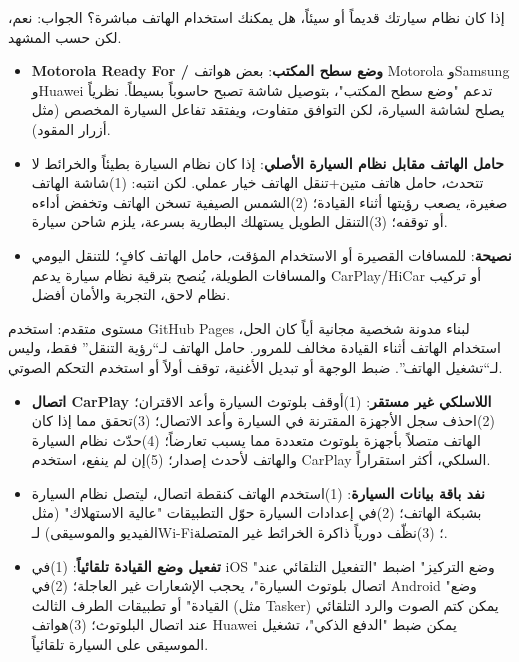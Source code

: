 
إذا كان نظام سيارتك قديماً أو سيئاً، هل يمكنك استخدام الهاتف مباشرة؟ الجواب: نعم، لكن حسب المشهد.

\begin{itemize}
  \item \textbf{Motorola Ready For / وضع سطح المكتب}: بعض هواتف Motorola وSamsung وHuawei تدعم "وضع سطح المكتب"، بتوصيل شاشة تصبح حاسوباً بسيطاً. نظرياً يصلح لشاشة السيارة، لكن التوافق متفاوت، ويفتقد تفاعل السيارة المخصص (مثل أزرار المقود).
  \item \textbf{حامل الهاتف مقابل نظام السيارة الأصلي}: إذا كان نظام السيارة بطيئاً والخرائط لا تتحدث، حامل هاتف متين+تنقل الهاتف خيار عملي. لكن انتبه: (1)شاشة الهاتف صغيرة، يصعب رؤيتها أثناء القيادة؛ (2)الشمس الصيفية تسخن الهاتف وتخفض أداءه أو توقفه؛ (3)التنقل الطويل يستهلك البطارية بسرعة، يلزم شاحن سيارة.
  \item \textbf{نصيحة}: للمسافات القصيرة أو الاستخدام المؤقت، حامل الهاتف كافٍ؛ للتنقل اليومي والمسافات الطويلة، يُنصح بترقية نظام سيارة يدعم CarPlay/HiCar أو تركيب نظام لاحق، التجربة والأمان أفضل.
\end{itemize}

\begin{tcbwarn}{مستوى متقدم: استخدم GitHub Pages لبناء مدونة شخصية مجانية}
أياً كان الحل، استخدام الهاتف أثناء القيادة مخالف للمرور. حامل الهاتف لـ“رؤية التنقل” فقط، وليس لـ“تشغيل الهاتف”. ضبط الوجهة أو تبديل الأغنية، توقف أولاً أو استخدم التحكم الصوتي.

\end{tcbwarn}


\begin{itemize}
  \item \textbf{اتصال CarPlay اللاسلكي غير مستقر}: (1)أوقف بلوتوث السيارة وأعد الاقتران؛ (2)احذف سجل الأجهزة المقترنة في السيارة وأعد الاتصال؛ (3)تحقق مما إذا كان الهاتف متصلاً بأجهزة بلوتوث متعددة مما يسبب تعارضاً؛ (4)حدّث نظام السيارة والهاتف لأحدث إصدار؛ (5)إن لم ينفع، استخدم CarPlay السلكي، أكثر استقراراً.
  \item \textbf{نفد باقة بيانات السيارة}: (1)استخدم الهاتف كنقطة اتصال، ليتصل نظام السيارة بشبكة الهاتف؛ (2)في إعدادات السيارة حوّل التطبيقات "عالية الاستهلاك" (مثل الفيديو والموسيقى) لـWi-Fi؛ (3)نظّف دورياً ذاكرة الخرائط غير المتصلة.
  \item \textbf{تفعيل وضع القيادة تلقائياً}: (1)في iOS "وضع التركيز" اضبط "التفعيل التلقائي عند اتصال بلوتوث السيارة"، يحجب الإشعارات غير العاجلة؛ (2)في Android "وضع القيادة" أو تطبيقات الطرف الثالث (مثل Tasker) يمكن كتم الصوت والرد التلقائي عند اتصال البلوتوث؛ (3)هواتف Huawei يمكن ضبط "الدفع الذكي"، تشغيل الموسيقى على السيارة تلقائياً.
\end{itemize}

